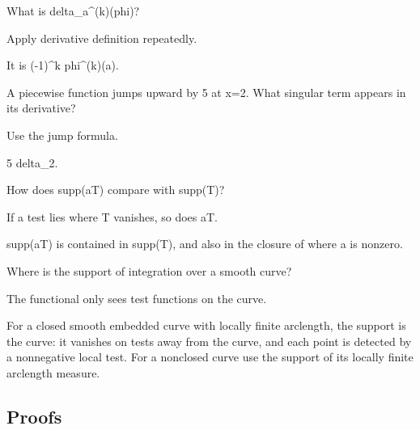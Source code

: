 \begin{exercise}\label{exr:iii17-expand-02}
What is delta\_a\textasciicircum{}(k)(phi)?
\end{exercise}
\begin{hint}
Apply derivative definition repeatedly.
\end{hint}
\begin{solution}
It is (-1)\textasciicircum{}k phi\textasciicircum{}(k)(a).
\end{solution}

\begin{exercise}\label{exr:iii17-expand-03}
A piecewise function jumps upward by 5 at x=2. What singular term appears in its derivative?
\end{exercise}
\begin{hint}
Use the jump formula.
\end{hint}
\begin{solution}
5 delta\_2.
\end{solution}

\begin{exercise}\label{exr:iii17-expand-04}
How does supp(aT) compare with supp(T)?
\end{exercise}
\begin{hint}
If a test lies where T vanishes, so does aT.
\end{hint}
\begin{solution}
supp(aT) is contained in supp(T), and also in the closure of where a is nonzero.
\end{solution}

\begin{exercise}\label{exr:iii17-expand-05}
Where is the support of integration over a smooth curve?
\end{exercise}
\begin{hint}
The functional only sees test functions on the curve.
\end{hint}
\begin{solution}
For a closed smooth embedded curve with locally finite arclength, the support is the curve: it vanishes on tests away from the curve, and each point is detected by a nonnegative local test. For a nonclosed curve use the support of its locally finite arclength measure.
\end{solution}

\subsection*{Proofs}

